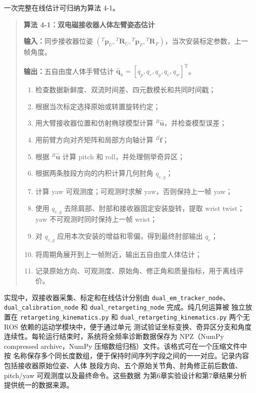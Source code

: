 一次完整在线估计可归纳为算法 4-1。

\begin{quote}
\textbf{算法 4-1：双电磁接收器人体左臂姿态估计}

\textbf{输入：}同步接收器位姿
$({}^{T}\boldsymbol p_U,{}^{T}\boldsymbol R_U,
{}^{T}\boldsymbol p_F,{}^{T}\boldsymbol R_F)$，当次安装标定参数，上一帧角度。

\textbf{输出：}五自由度人体手臂估计
$\hat{\boldsymbol q}_h=[q_p,q_r,q_y,q_e,q_w]^{\mathrm T}$。

\begin{enumerate}[label=\arabic*.]
  \item 检查数据新鲜度、双流时间差、四元数模长和共同时间戳；
  \item 根据当次标定选择原始或转置旋转约定；
  \item 用大臂接收器位置和仿射椭球模型计算 ${}^{B}\hat{\boldsymbol u}$，并检查模型误差；
  \item 用前臂方向对齐矩阵和局部方向轴计算 ${}^{B}\hat{\boldsymbol f}$；
  \item 根据 ${}^{B}\hat{\boldsymbol u}$ 计算 pitch 和 roll，并处理侧举奇异区；
  \item 根据两条肢段方向的内积计算几何肘角 $q_{e,g}$；
  \item 计算 yaw 可观测度；可观测时求解 yaw，否则保持上一帧 yaw；
  \item 使用 $q_{e,g}$ 去除肩部、肘部和接收器固定安装旋转，提取 wrist twist；yaw
        不可观测时同时保持上一帧 wrist；
  \item 对 $q_{e,g}$ 应用本次安装的增益和零偏，得到最终肘部输出 $q_e$；
  \item 将周期角展开到上一帧附近，输出五自由度人体估计；
  \item 记录原始方向、可观测度、原始角、修正角和质量指标，用于离线评价。
\end{enumerate}
\end{quote}

实现中，双接收器采集、标定和在线估计分别由 \texttt{dual\_em\_tracker\_node}、
\texttt{dual\_calibration\_node} 和 \texttt{dual\_retargeting\_node} 完成。纯几何运算被
独立放置在 \texttt{retargeting\_kinematics.py} 和
\texttt{dual\_retargeting\_kinematics.py} 两个无 ROS 依赖的运动学模块中，便于通过单元
测试验证坐标变换、奇异区分支和角度连续性。每轮运行结束时，系统将全频率诊断数据保存为
NPZ（NumPy compressed archive，NumPy 压缩数组归档）文件。该格式可在一个压缩文件中按
名称保存多个同长度数组，便于保持时间序列字段之间的一一对应。记录内容包括接收器原始位姿、人体
肢段方向、五个原始关节角、肘角修正前后数值、pitch/yaw 可观测度以及最终命令。这些数据
为第6章实验设计和第7章结果分析提供统一的数据来源。

